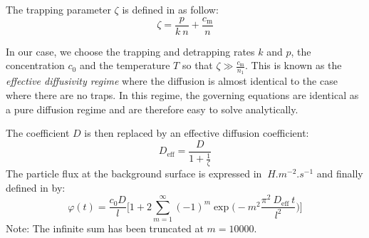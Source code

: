 The trapping parameter $\zeta$ is defined in  as follow:
\begin{equation}
    \zeta = \frac{p}{k \: n} + \frac{c_\mathrm{m}}{n}
\end{equation}

In our case, we choose the trapping and detrapping rates $k$ and $p$, the concentration $c_0$ and the temperature $T$ so that $\zeta \gg \frac{c_\mathrm{m}}{n_1}$.
This is known as the \textit{effective diffusivity regime} where the diffusion is almost identical to the case where there are no traps.
In this regime, the governing equations are identical as a pure diffusion regime and are therefore easy to solve analytically.

The coefficient $D$ is then replaced by an effective diffusion coefficient:
\begin{equation}
    D_\mathrm{eff} = \frac{D}{1+\frac{1}{\zeta}}
\end{equation}
The particle flux at the background surface is expressed in $\SI{}{H.m^{-2}.s^{-1}}$ and finally defined in  by:
\begin{equation}
    \varphi(t) = \frac{c_0 D}{l}\bigg[1+2\sum_{m=1}^{\infty}(-1)^m \exp\bigg(-m^2\frac{\pi^2 \:D_\mathrm{eff} \: t}{l^2}\bigg)\bigg]
\label{eq:flux analytical}
\end{equation}
Note: The infinite sum has been truncated at $m=10000$.

